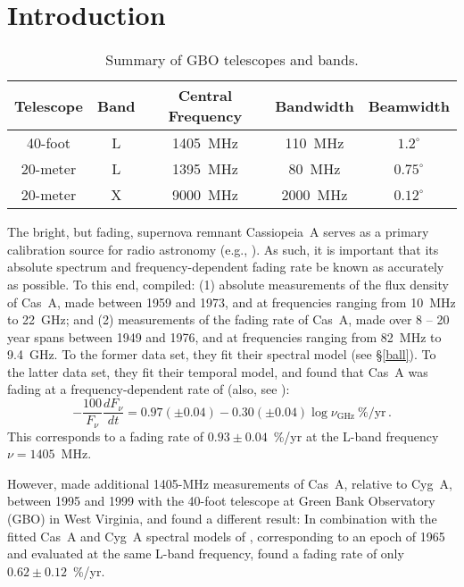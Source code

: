 \documentclass[fleqn,usenatbib]{mnras}
\begin{document}
\section{Introduction}\label{intro}

\begin{table*}
\caption{Summary of GBO telescopes and bands.}\label{tabtel}
\centering
\begin{tabular}{c c c c c}
\hline 
\hline 
Telescope & Band & Central Frequency & Bandwidth & Beamwidth \\
\hline 
\hline 
40-foot  &  L  &  1405~MHz  &  110~MHz  & $1.2^\circ$	\\
20-meter  &  L  &  1395~MHz  &  80~MHz  & $0.75^\circ$ \\
20-meter  &  X  &  9000~MHz  &  2000~MHz  & $0.12^\circ$ \\
\hline 
\end{tabular}
\end{table*}

The bright, but fading, supernova remnant Cassiopeia~A serves as a primary calibration source for radio astronomy (e.g., \citealt{b77}).  As such, it is important that its absolute spectrum and frequency-dependent fading rate be known as accurately as possible.  To this end, \citet{b77} compiled:  (1) absolute measurements of the flux density of Cas~A, made between 1959 and 1973, and at frequencies ranging from 10~MHz to 22~GHz; and (2) measurements of the fading rate of Cas~A, made over 8 -- 20 year spans between 1949 and 1976, and at frequencies ranging from 82~MHz to 9.4~GHz.  To the former data set, they fit their spectral model (see \S\ref{ball}).  To the latter data set, they fit their temporal model, and found that Cas~A was fading at a frequency-dependent rate of (also, see \citealt{d74}):
\begin{equation}\label{eq1}
-\frac{100}{F_\nu}\frac{dF_\nu}{dt} = 0.97(\pm 0.04)-0.30(\pm 0.04)\log\nu_{\mathrm{GHz}}~\mbox{\%/yr} \, .
\end{equation}
\noindent
This corresponds to a fading rate of $0.93 \pm 0.04$~\%/yr at the L-band frequency $\nu = 1405$~MHz.  









However, \citet{r00} made additional 1405-MHz measurements of Cas~A, relative to Cyg~A, between 1995 and 1999 with the 40-foot telescope at Green Bank Observatory (GBO) in West Virginia, and found a different result:  In combination with the fitted Cas~A and Cyg~A spectral models of \citet{b77}, corresponding to an epoch of 1965 and evaluated at the same L-band frequency, \citet{r00} found a fading rate of only $0.62 \pm 0.12$~\%/yr.  
\end{document}
